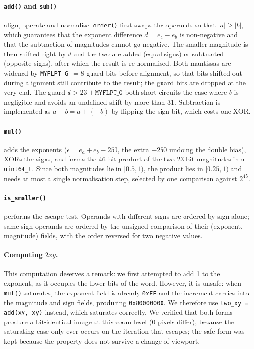 \documentclass[10pt,a4paper]{article}
\begin{document}
\paragraph{\texttt{add()} and \texttt{sub()}} align, operate and normalise. \texttt{order()} first swaps the operands so that $|a| \ge |b|$, which guarantees that
the exponent difference $d = e_a - e_b$ is non-negative and that the subtraction of magnitudes
cannot go negative. The smaller magnitude is then shifted right by $d$ and the two are added
(equal signs) or subtracted (opposite signs), after which the result is re-normalised. Both
mantissas are widened by \texttt{MYFLPT\_G}~$=8$ guard bits before alignment, so that bits shifted
out during alignment still contribute to the result; the guard bits are dropped at the very end.
The guard $d > 23 + \mathtt{MYFLPT\_G}$ both short-circuits the case where $b$ is negligible and
avoids an undefined shift by more than 31. Subtraction is implemented as
$a - b = a + (-b)$ by flipping the sign bit, which costs one XOR.

\paragraph{\texttt{mul()}} adds the exponents ($e = e_a + e_b - 250$, the extra $-250$ undoing the
double bias), XORs the signs, and forms the $46$-bit product of the two 23-bit magnitudes in a
\texttt{uint64\_t}. Since both magnitudes lie in $[0.5, 1)$, the product lies in $[0.25, 1)$ and
needs at most a single normalisation step, selected by one comparison against $2^{45}$.

\paragraph{\texttt{is\_smaller()}} performs the escape test. Operands with different signs are
ordered by sign alone; same-sign operands are ordered by the unsigned comparison of their
(exponent, magnitude) fields, with the order reversed for two negative values.

\paragraph{Computing $2xy$.} 
This computation deserves a remark: we first attempted to add 1 to the exponent, as it 
occupies the lower bits of the word.
However, it is unsafe: when \texttt{mul()} saturates, the exponent field is already \texttt{0xFF} 
and the increment carries into the magnitude and sign fields, producing \texttt{0x80000000}. 
We therefore use \texttt{two\_xy = add(xy, xy)} instead, which saturates correctly. We verified that both forms
produce a bit-identical image at this zoom level (0 pixels differ), because the
saturating case only ever occurs on the iteration that escapes; the safe form was kept because the
property does not survive a change of viewport.
\end{document}
